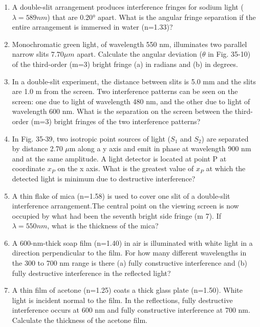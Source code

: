 \documentclass[fleqn]{article}
\begin{document}
\begin{enumerate}
    \item A double-slit arrangement produces interference fringes for sodium light ($\lambda=589 nm$) that are 0.20° apart. What is the angular fringe separation if the entire arrangement is immersed in water (n=1.33)?

    \item Monochromatic green light, of wavelength 550 nm, illuminates two parallel narrow slits $7.70 \mu m$ apart. Calculate the angular deviation ($\theta$ in Fig. 35-10) of the third-order (m=3) bright fringe (a) in radians and (b) in degrees.

    \item In a double-slit experiment, the distance between slits is 5.0 mm and the slits are 1.0 m from the screen. Two interference patterns can be seen on the screen: one due to light of wavelength 480 nm, and the other due to light of wavelength 600 nm. What is the separation on the screen between the third-order (m=3) bright fringes of the two interference patterns?

    \item In Fig. 35-39, two isotropic point sources of light ($S_1$ and $S_2$) are separated by distance 2.70 $\mu$m along a y axis and emit in phase at wavelength 900 nm and at the same amplitude. A light detector is located at point P at coordinate $x_P$ on the x axis. What is the greatest value of $x_P$ at which the detected light is minimum due to destructive interference?

    \item A thin flake of mica (n=1.58) is used to cover one slit of a double-slit interference arrangement.The central point on the viewing screen is now occupied by what had been the seventh bright side fringe (m  7). If $\lambda=550 nm$, what is the thickness of the mica?

    \item A 600-nm-thick soap film (n=1.40) in air is illuminated with white light in a direction perpendicular to the film. For how many different wavelengths in the 300 to 700 nm range is there (a) fully constructive interference and (b) fully destructive interference in the reflected light?

    \item A thin film of acetone (n=1.25) coats a thick glass plate (n=1.50). White light is incident normal to the film. In the reflections, fully destructive interference occurs at 600 nm and fully constructive interference at 700 nm. Calculate the thickness of the acetone film.


\end{enumerate}
\end{document}
